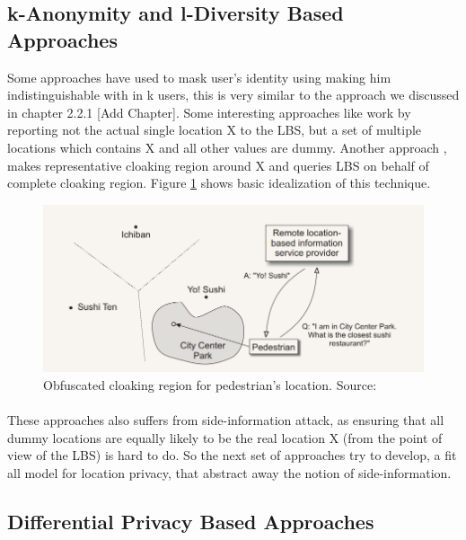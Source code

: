 \documentclass[12pt]{report}
\theoremstyle{named}
\begin{document}
\subsection{k-Anonymity and l-Diversity Based Approaches}
Some approaches have used to mask user's identity using making him indistinguishable with in k users, this is very similar to the approach we discussed in chapter 2.2.1 [Add Chapter]. Some interesting approaches like \cite{kido2005protection} work by reporting not the actual single location X to the LBS, but a set of multiple locations which contains X and all other values are dummy. Another approach \cite{duckham2005formal}, makes representative cloaking region around X and queries LBS on behalf of complete cloaking region. Figure \ref{fig:obfuscationRegion} shows basic idealization of this technique.


\begin{figure}[ht]
\centering
        \includegraphics[width=120mm,scale=1]{Images/obfuscationRegion.PNG}
    \caption{Obfuscated cloaking region for pedestrian's location. Source:\cite{duckham2005formal}}
    \label{fig:obfuscationRegion}
\end{figure}

\paragraph{}
These approaches also suffers from side-information attack, as ensuring that all dummy locations are equally likely to be the real location X (from the point of view of the LBS) is hard to do. So the next set of approaches try to develop, a fit all model for location privacy, that abstract away the notion of side-information.



\subsection{Differential Privacy Based Approaches}
\end{document}
